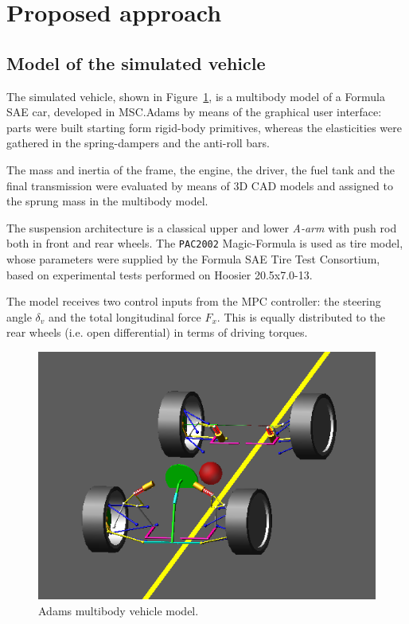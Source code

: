\documentclass[conference]{IEEEtran} %
\begin{document}

\section{Proposed approach} %


\subsection{Model of the simulated vehicle}
The simulated vehicle, shown in Figure~\ref{fig:Adams_vehicle}, is a multibody model of a Formula SAE car, developed in MSC.Adams by means of the graphical user interface: parts were built starting form rigid-body primitives, whereas the elasticities were gathered in the spring-dampers and the anti-roll bars.

The mass and inertia of the frame, the engine, the driver, the fuel tank and the final transmission were evaluated by means of 3D CAD models and assigned to the sprung mass in the multibody model.

The suspension architecture is a classical upper and lower \emph{A-arm} with push rod both in front and rear wheels. The \texttt{PAC2002} Magic-Formula is used as tire model, whose parameters were supplied by the Formula SAE Tire Test Consortium, based on experimental tests performed on Hoosier 20.5x7.0-13.

The model receives two control inputs from the MPC controller: the steering angle $\delta_v$ and the total longitudinal force $F_{x}$. This is equally distributed to the rear wheels (i.e. open differential) in terms of driving torques.

\begin{figure}[htb] \centering
	
	\includegraphics[width=0.8\linewidth]{adams_vehicle}
	
	\caption{Adams multibody vehicle model.}
	
	\label{fig:Adams_vehicle}
	
\end{figure}
\end{document}
